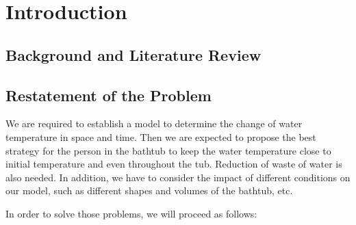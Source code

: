 \section{Introduction}

\subsection{Background and Literature Review}

\subsection{Restatement of the Problem}

We are required to establish a model to determine the change of water temperature in space and time. Then we are expected to propose the best strategy for the person in the bathtub to keep the water temperature close to initial temperature and even throughout the tub. Reduction of waste of water is also needed. In addition, we have to consider the impact of different conditions on our model, such as different shapes and volumes of the bathtub, etc.

In order to solve those problems, we will proceed as follows:

